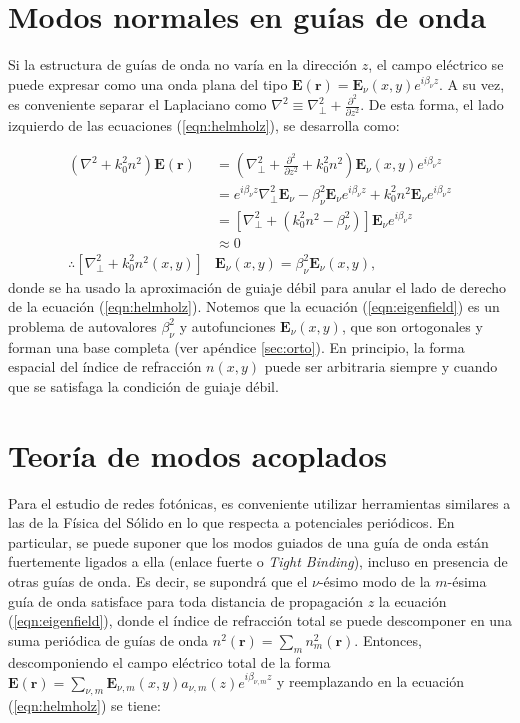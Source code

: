 \section{Modos normales en guías de onda}

Si la estructura de guías de onda no varía en la dirección $z$, el campo eléctrico se puede expresar como una onda plana del tipo $\textbf{E}(\textbf{r}) = \textbf{E}_\nu(x, y) e^{i\beta_\nu z}$. A su vez, es conveniente separar el Laplaciano como $\nabla^2 \equiv \nabla_\perp^2 + \frac{\partial^2}{\partial z^2}$. De esta forma, el lado izquierdo de las ecuaciones (\ref{eqn:helmholz}), se desarrolla como:

\begin{align}
	(\nabla^2  + k_0^2n^2) \textbf{E}(\textbf{r}) &= \left(\nabla_\perp^2 + \frac{\partial^2}{\partial z^2} + k_0^2n^2\right) \textbf{E}_\nu(x, y)  e^{i\beta_\nu z} \nonumber
\\	
	&= e^{i\beta_\nu z} \nabla_\perp^2 \textbf{E}_\nu -\beta_\nu^2\textbf{E}_\nu e^{i\beta_\nu z} + k_0^2n^2 \textbf{E}_\nu  e^{i\beta_\nu z}
\nonumber	
	\\	
	&= \left[  \nabla_\perp^2  + (k_0^2n^2-\beta_\nu^2) \right]\textbf{E}_\nu  e^{i\beta_\nu z}
	\nonumber	
	\\
	&\approx
	0
	\nonumber
	\\
	\therefore
	 \left[  \nabla_\perp^2  + k_0^2n^2(x,y) \right]&\textbf{E}_\nu(x,y)  = \beta_\nu^2 \textbf{E}_\nu(x,y), \label{eqn:eigenfield}
\end{align}
donde se ha usado la aproximación de guiaje débil para anular el lado de derecho de la ecuación (\ref{eqn:helmholz}). Notemos que la ecuación (\ref{eqn:eigenfield}) es un problema de autovalores $\beta_\nu^2$ y autofunciones $\textbf{E}_\nu(x,y)$, que son ortogonales y forman una base completa (ver apéndice \ref{sec:orto}). En principio, la forma espacial del índice de refracción $n(x, y)$ puede ser arbitraria siempre y cuando que se satisfaga la condición de guiaje débil. 

\section{Teoría de modos acoplados}
	Para el estudio de redes fotónicas, es conveniente utilizar herramientas similares a las de la Física del Sólido en lo que respecta a potenciales periódicos. En particular, se puede suponer que los modos guiados de una guía de onda están fuertemente ligados a ella (enlace fuerte o \textit{Tight Binding}), incluso en presencia de otras guías de onda. Es decir, se supondrá que el $\nu$-ésimo modo de la $m$-ésima guía de onda satisface para toda distancia de propagación $z$ la ecuación (\ref{eqn:eigenfield}), donde el índice de refracción total se puede descomponer en una suma periódica de guías de onda $n^2(\textbf{r}) = \sum_{m} n^2_m(\textbf{r})$. Entonces, descomponiendo el campo eléctrico total de la forma $\textbf{E}(\textbf{r}) = \sum_{\nu, m} \textbf{E}_{\nu, m}(x, y) a_{\nu, m}(z) e^{i\beta_{\nu, m} z}$ y reemplazando en la ecuación (\ref{eqn:helmholz}) se tiene:

